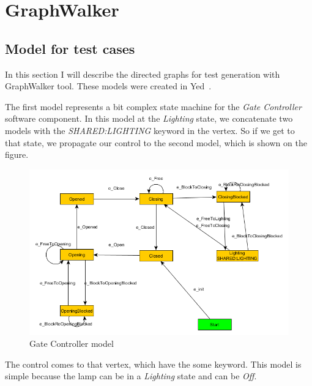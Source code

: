 \chapter{GraphWalker}\label{sect:GraphWalker implementation of Garage Gate model}


\section{Model for test cases}

In this section I will describe the directed graphs for test generation with GraphWalker tool. These models were created in Yed~\cite{yEd}.

The first model represents a bit complex state machine for the \textit{Gate Controller} software component. In this model at the \textit{Lighting} state, we concatenate two models with the \textit{SHARED:LIGHTING} keyword in the vertex. So if we get to that state, we propagate our control to the second model, which is shown on the  figure.

\begin{figure}[!ht]
	\centering
	\includegraphics[width=150mm, keepaspectratio]{figures/GateModel.png}
	\caption{Gate Controller model}
	\label{fig:GateModel}
\end{figure}

The control comes to that vertex, which have the some keyword. This model is simple because the lamp can be in a \textit{Lighting} state and can be \textit{Off}.


